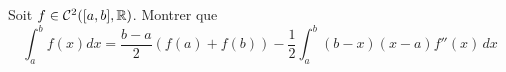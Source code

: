 Soit $f \in \mathcal{C}^{2}([a,b],\mathbb{R})$. Montrer que
$$\int_{a}^{b}f(x)dx=\frac{b-a}{2}(f(a)+f(b))-\frac{1}{2}\int_{a}^{b}(b-x)(x-a)f''(x)\,dx$$
